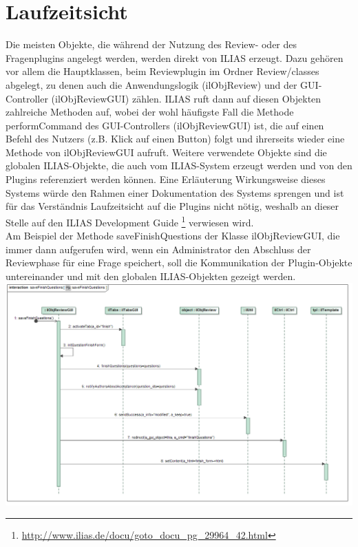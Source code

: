 \documentclass[a4paper]{scrreprt}
\begin{document}
\chapter{Laufzeitsicht}
Die meisten Objekte, die während der Nutzung des Review- oder des Fragenplugins angelegt werden, werden direkt von ILIAS erzeugt. Dazu gehören vor allem die Hauptklassen, beim Reviewplugin im Ordner Review/classes abgelegt, zu denen auch die Anwendungslogik (ilObjReview) und der GUI-Controller (ilObjReviewGUI) zählen. ILIAS ruft dann auf diesen Objekten zahlreiche Methoden auf, wobei der wohl häufigste Fall die Methode performCommand des GUI-Controllers (ilObjReviewGUI) ist, die auf einen Befehl des Nutzers (z.B. Klick auf einen Button) folgt und ihrerseits wieder eine Methode von ilObjReviewGUI aufruft. Weitere verwendete Objekte sind die globalen ILIAS-Objekte, die auch vom ILIAS-System erzeugt werden und von den Plugins referenziert werden können. Eine Erläuterung Wirkungsweise dieses Systems würde den Rahmen einer Dokumentation des Systems sprengen und ist für das Verständnis Laufzeitsicht auf die Plugins nicht nötig, weshalb an dieser Stelle auf den ILIAS Development Guide \footnote{\url{http://www.ilias.de/docu/goto_docu_pg_29964_42.html}} verwiesen wird.\\
Am Beispiel der Methode saveFinishQuestions der Klasse ilObjReviewGUI, die immer dann aufgerufen wird, wenn ein Administrator den Abschluss der Reviewphase für eine Frage speichert, soll die Kommunikation der Plugin-Objekte untereinander und mit den globalen ILIAS-Objekten gezeigt werden.\\
\includegraphics[width=1.0\textwidth]{Sequence_Diagram__saveFinishQuestions__saveFinishQuestions.png}
\label{Fertige Fragen Speichern}\\ 
\end{document}
